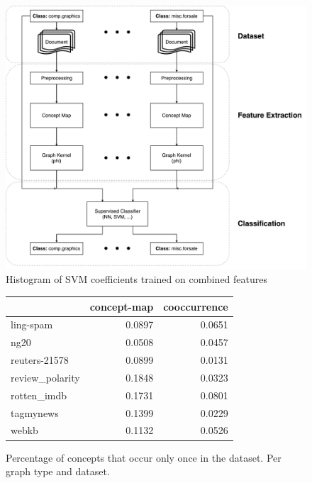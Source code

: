 \begin{figure}[ht]
\centering\includegraphics[width=0.6\linewidth]{assets/figures/approach.pdf}
\caption{Histogram of SVM coefficients trained on combined features}
\end{figure}

\begin{figure}[ht]
\centering
\begin{tabular}{lrr}
\toprule
 &  concept-map &  cooccurrence \\
\midrule
ling-spam       &  0.0897 &  0.0651 \\
ng20            &  0.0508 &  0.0457 \\
reuters-21578   &  0.0899 &  0.0131 \\
review\_polarity &  0.1848 &  0.0323 \\
rotten\_imdb     &  0.1731 &  0.0801 \\
tagmynews       &  0.1399 &  0.0229 \\
webkb           &  0.1132 &  0.0526 \\
\bottomrule
\end{tabular}\caption{Percentage of concepts that occur only once in the dataset. Per graph type and dataset.}
\end{figure}


